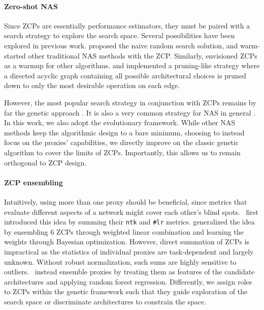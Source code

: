\documentclass[10pt]{article} %
\begin{document}
\paragraph{Zero-shot NAS} Since ZCPs are essentially performance estimators, they must be paired with a search strategy to explore the search space. Several possibilities have been explored in previous work. \citet{mellor2021neural} proposed the naive random search solution, and warm-started other traditional NAS methods with the ZCP. Similarly, \citet{abdelfattah2021zero} envisioned ZCPs as a warmup for other algorithms. \citet{chen2021neural} and \citet{jiang2023meco} implemented a pruning-like strategy where a directed acyclic graph containing all possible architectural choices is pruned down to only the most desirable operation on each edge. 

However, the most popular search strategy in conjunction with ZCPs remains by far the genetic approach \citep{lin2021zen, li2023zico, peng2024swap}. It is also a very common strategy for NAS in general \citep{real2018regularized, ericsson2024einspace}. In this work, we also adopt the evolutionary framework. While other NAS methods keep the algorithmic design to a bare minimum, choosing to instead focus on the proxies' capabilities, we directly improve on the classic genetic algorithm to cover the limits of ZCPs. Importantly, this allows us to remain orthogonal to ZCP design.

\paragraph{ZCP ensembling} Intuitively, using more than one proxy should be beneficial, since metrics that evaluate different aspects of a network might cover each other's blind spots.~\citet{chen2021neural} first introduced this idea by summing their \texttt{ntk} and \texttt{\#lr} metrics. \citet{he2024robustifying} generalized the idea by ensembling 6 ZCPs through weighted linear combination and learning the weights through Bayesian optimization. However, direct summation of ZCPs is impractical as the statistics of individual proxies are task-dependent and largely unknown. Without robust normalization, such sums are highly sensitive to outliers.~\citet{kadlecova2024surprisingly} instead ensemble proxies by treating them as features of the candidate architectures and applying random forest regression. Differently, we assign roles to ZCPs within the genetic framework such that they guide exploration of the search space or discriminate architectures to constrain the space.
\end{document}
